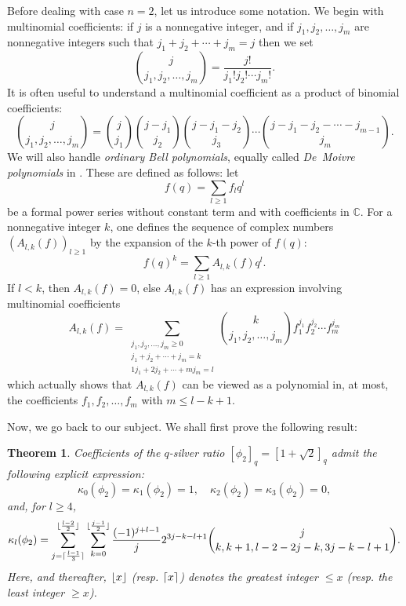 \documentclass[11pt,reqno]{amsart}
\theoremstyle{plain}
\newtheorem{theoreme}[lemme]{Theorem}
\theoremstyle{definition}
\numberwithin{figure}{section}
\numberwithin{table}{section}
\numberwithin{equation}{section}
\newcommand{\C}{\mathbb{C}}
\newcommand\ka{\kappa}
\let\fr=\frac
\DeclarePairedDelimiter{\ceil}{\lceil}{\rceil}%
\DeclarePairedDelimiter{\floor}{\lfloor}{\rfloor}%
\begin{document}
Before dealing with case $n=2$, let us introduce some  notation. We begin with multinomial coefficients: if $j$ is a nonnegative integer, and if $j_1,j_2,\ldots, j_m$ are nonnegative integers such that $j_1+j_2+\cdots +j_m=j$ then we set
\begin{equation*}
\binom{j}{j_1,j_2,\ldots,j_m}=\fr{j!}{j_1!j_2!\cdots j_m!}.
\end{equation*}
It is often useful to understand a multinomial coefficient as a product of binomial coefficients:
\begin{equation*}
\binom{j}{j_1,j_2,\ldots,j_m}
=\binom{j}{j_1}\binom{j-j_1}{j_2}\binom{j-j_1-j_2}{j_3}\cdots\binom{j-j_1-j_2-\cdots-j_{m-1}}{j_m}.
\end{equation*}
We will also handle \emph{ordinary Bell polynomials}, equally called \emph{De~Moivre polynomials} in \cite{OSullivan22}. These are defined as follows: let 
\begin{equation*}
f(q)=\sum_{l≥1}f_l q^l
\end{equation*} 
be a formal power series without constant term and with coefficients in $\C$. For a nonnegative integer $k$, one defines the sequence of complex numbers $(A_{l,k}(f))_{l≥1}$ by the expansion of the $k$-th power of $f(q)$:
\begin{equation*}
f(q)^k=\sum_{l≥1}A_{l,k}(f)q^l.
\end{equation*}
If $l<k$, then $A_{l,k}(f)=0$, else $A_{l,k}(f)$ has an expression involving multinomial coefficients
\begin{equation}\label{defBell}
A_{l,k}(f)=\sum_{\substack{j_1,j_2,\ldots,j_m≥0\\ j_1+j_2+\cdots +j_m=k\\ 1j_1+2j_2+\cdots+m j_m=l}}
\binom{k}{j_1,j_2,\ldots,j_m}f_1^{j_1} f_2^{j_2}\cdots f_m^{j_m}
\end{equation}
which actually shows that $A_{l,k}(f)$ can be viewed as a polynomial in, at most, the coefficients $f_1,f_2,\ldots, f_m$ with $m≤l-k+1$.

Now, we go back to our subject. We shall first prove the following result:

\begin{theoreme}\label{thm:S-coeffs} 
Coefficients of the $q$-silver ratio $[\phi_2]_q=[1+\sqrt{2}]_q$ admit the following explicit expression:
\begin{equation*}
\ka_0(\phi_2)=\ka_1(\phi_2)=1,\quad \ka_2(\phi_2)=\ka_3(\phi_2)=0,
\end{equation*}
and,  for  $l≥4$,
\begin{equation}\label{s(n)}
\ka_l(\phi_2)=\sum_{j=\ceil{\fr{l-1}{3}}}^{\floor{\fr{l-2}{2}}} 
\sum_{k=0}^{\floor{\fr{j-1}{2}}}\fr{(-1)^{j+l-1}}{j} 2^{3j-k-l+1}
\binom{j}{k,k+1,l-2-2j-k,3j-k-l+1}.
\end{equation}
Here, and thereafter, $\floor{x}$ (resp. $\ceil{x}$) denotes the greatest integer $≤x$ (resp. the least integer $≥x$).
\end{theoreme}
\end{document}
